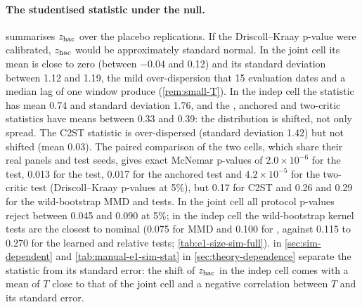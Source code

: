 \begin{table}[tbp]
  \centering
  \caption{Monte Carlo check of the conservative fixed-$b$ reference on the E1(a) designs. For
    every combination of numbers of evaluation dates $U_X,U_Y$ and Bartlett lags $H_X,H_Y$ that
    occurs in the fixed-$b$ rows of \cref{tab:e1-size-sim-full} (Calls: test calls with these
    combinations, over tests, cells and 200 replications), 200,000 pairs of contiguous \iid{}
    $N(0,1)$ series of lengths $U_X$ and $U_Y$ give the two-sample Bartlett HAC statistic with
    share $\lambda$ of the first sample in the variance of the mean difference, for 21 values of
    $\lambda$ on $[0,1]$. Each value is referred to the conservative reference (one series with
    $\min(U_X,U_Y)$ dates and lag $\max(H_X,H_Y)$, same reference draws as in the run). Entries:
    largest rejection rate over combinations and $0<\lambda<1$; in parentheses, over
    $0\le\lambda\le1$ ($\lambda\in\{0,1\}$: a single series).}
  \label{tab:e1-fixedb-check}
  \small
\end{table}

\paragraph{The studentised statistic under the null.}
 summarises $z_{\mathrm{hac}}$ over the placebo replications. If the Driscoll--Kraay
p-value were calibrated, $z_{\mathrm{hac}}$ would be approximately standard normal. In the joint cell its mean
is close to zero (between $-0.04$ and 0.12) and its standard deviation between 1.12 and 1.19, the
mild over-dispersion that 15 evaluation dates and a median lag of one window produce
(\cref{rem:small-T}). In the indep cell the \WC{} statistic has mean 0.74 and standard deviation
1.76, and the \LRC{}, anchored and two-critic statistics have means between 0.33 and 0.39: the
distribution is shifted, not only spread. The C2ST statistic is over-dispersed (standard deviation
1.42) but not shifted (mean 0.03). The paired comparison of the two cells, which share their
real panels and test seeds, gives exact McNemar p-values \citep{mcnemar_1947_note} of
$2.0\times10^{-6}$ for the \WC{} test, 0.013 for the \LRC{} test, 0.017 for the anchored test and
$4.2\times10^{-5}$ for the two-critic test (Driscoll--Kraay p-values at 5\%), but 0.17 for C2ST and
0.26 and 0.29 for the wild-bootstrap MMD and \SigMMD{} tests. In the joint cell all protocol
p-values reject between 0.045 and 0.090 at 5\%; in the indep cell the wild-bootstrap kernel tests
are the closest to nominal (0.075 for MMD and 0.100 for \SigMMD{}, against 0.115 to 0.270 for the
learned and relative tests; \cref{tab:e1-size-sim-full}).  in
\cref{sec:sim-dependent} and \cref{tab:manual-e1-sim-stat} in \cref{sec:theory-dependence}
separate the statistic from its standard error: the shift of $z_{\mathrm{hac}}$ in the indep cell comes with
a mean of $T$ close to that of the joint cell and a negative correlation between $T$ and its
standard error.

